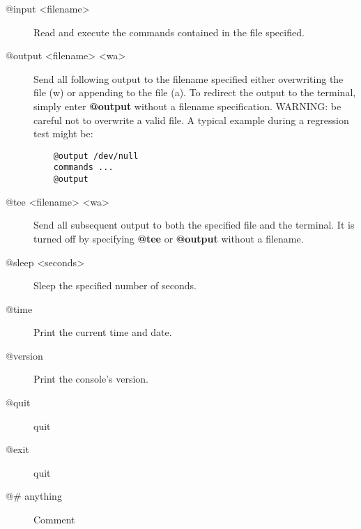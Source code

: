 \begin{description}

\item [@input {\textless}filename{\textgreater}]
   Read and execute the commands  contained in the file specified.

\item [@output {\textless}filename{\textgreater} {\textless}w{\textbar}a{\textgreater}]
   Send all following output to the  filename specified either overwriting the
file (w) or appending to  the file (a). To redirect the output to the
terminal, simply enter  {\bf @output} without a filename specification.
WARNING: be careful  not to overwrite a valid file. A typical example during a
regression  test might be:

\footnotesize
\begin{verbatim}
    @output /dev/null
    commands ...
    @output
\end{verbatim}
\normalsize

\item [@tee {\textless}filename{\textgreater} {\textless}w{\textbar}a{\textgreater}]
   Send all subsequent output to  both the specified file and the terminal. It is
   turned off by  specifying {\bf @tee} or {\bf @output} without a filename.

\item [@sleep {\textless}seconds{\textgreater}]
   Sleep the specified number of seconds.

\item [@time]
   Print the current time and date.

\item [@version]
   Print the console's version.

\item [@quit]
   quit

\item [@exit]
   quit

\item [@\# anything]
   Comment


\end{description}
